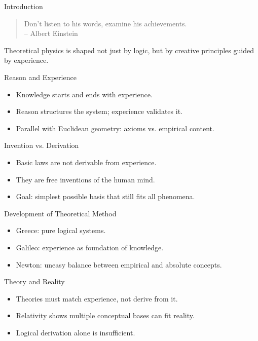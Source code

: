 
\begin{frame}{Introduction}
  \begin{quote}
    Don't listen to his words, examine his achievements. \\-- Albert Einstein
  \end{quote}
  Theoretical physics is shaped not just by logic, but by creative principles
  guided by experience.
\end{frame}

\begin{frame}{Reason and Experience}
  \begin{itemize}
    \item Knowledge starts and ends with experience.
    \item Reason structures the system; experience validates it.
    \item Parallel with Euclidean geometry: axioms vs. empirical content.
  \end{itemize}
\end{frame}

\begin{frame}{Invention vs. Derivation}
  \begin{itemize}
    \item Basic laws are not derivable from experience.
    \item They are free inventions of the human mind.
    \item Goal: simplest possible basis that still fits all phenomena.
  \end{itemize}
\end{frame}

\begin{frame}{Development of Theoretical Method}
  \begin{itemize}
    \item Greece: pure logical systems.
    \item Galileo: experience as foundation of knowledge.
    \item Newton: uneasy balance between empirical and absolute concepts.
  \end{itemize}
\end{frame}

\begin{frame}{Theory and Reality}
  \begin{itemize}
    \item Theories must match experience, not derive from it.
    \item Relativity shows multiple conceptual bases can fit reality.
    \item Logical derivation alone is insufficient.
  \end{itemize}
\end{frame}

